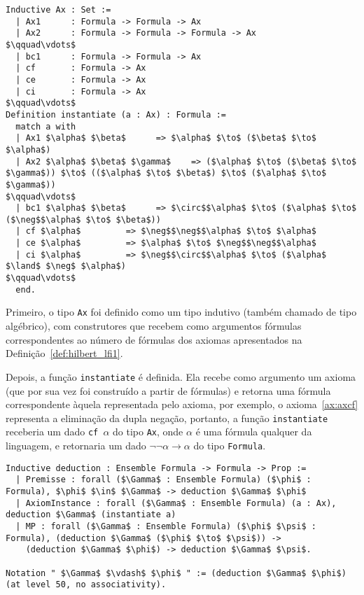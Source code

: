       \begin{lstlisting}[name=Syntax, frame=single, language=coq]
Inductive Ax : Set :=
  | Ax1      : Formula -> Formula -> Ax
  | Ax2      : Formula -> Formula -> Formula -> Ax
$\qquad\vdots$
  | bc1      : Formula -> Formula -> Ax
  | cf       : Formula -> Ax
  | ce       : Formula -> Ax
  | ci       : Formula -> Ax
$\qquad\vdots$
Definition instantiate (a : Ax) : Formula :=
  match a with 
  | Ax1 $\alpha$ $\beta$      => $\alpha$ $\to$ ($\beta$ $\to$ $\alpha$)
  | Ax2 $\alpha$ $\beta$ $\gamma$    => ($\alpha$ $\to$ ($\beta$ $\to$ $\gamma$)) $\to$ (($\alpha$ $\to$ $\beta$) $\to$ ($\alpha$ $\to$ $\gamma$))
$\qquad\vdots$
  | bc1 $\alpha$ $\beta$      => $\circ$$\alpha$ $\to$ ($\alpha$ $\to$ ($\neg$$\alpha$ $\to$ $\beta$))
  | cf $\alpha$         => $\neg$$\neg$$\alpha$ $\to$ $\alpha$
  | ce $\alpha$         => $\alpha$ $\to$ $\neg$$\neg$$\alpha$
  | ci $\alpha$         => $\neg$$\circ$$\alpha$ $\to$ ($\alpha$ $\land$ $\neg$ $\alpha$)
$\qquad\vdots$
  end.
      \end{lstlisting}

      Primeiro, o tipo \texttt{Ax} foi definido como um tipo indutivo (também chamado de tipo algébrico), com construtores que recebem como argumentos fórmulas correspondentes ao número de fórmulas dos axiomas apresentados na Definição~\ref{def:hilbert_lfi1}. 
      
      Depois, a função \texttt{instantiate} é definida. Ela recebe como argumento um axioma (que por sua vez foi construído a partir de fórmulas) e retorna uma fórmula correspondente àquela representada pelo axioma, por exemplo, o axioma~\ref{ax:axcf} representa a eliminação da dupla negação, portanto, a função \texttt{instantiate} receberia um dado \texttt{cf $\alpha$} do tipo \texttt{Ax}, onde $\alpha$ é uma fórmula qualquer da linguagem, e retornaria um dado $\neg\neg\alpha \to \alpha$ do tipo \texttt{Formula}.

      \begin{lstlisting}[name=Syntax, frame=single, language=coq]
Inductive deduction : Ensemble Formula -> Formula -> Prop :=
  | Premisse : forall ($\Gamma$ : Ensemble Formula) ($\phi$ : Formula), $\phi$ $\in$ $\Gamma$ -> deduction $\Gamma$ $\phi$
  | AxiomInstance : forall ($\Gamma$ : Ensemble Formula) (a : Ax), deduction $\Gamma$ (instantiate a)
  | MP : forall ($\Gamma$ : Ensemble Formula) ($\phi$ $\psi$ : Formula), (deduction $\Gamma$ ($\phi$ $\to$ $\psi$)) -> 
    (deduction $\Gamma$ $\phi$) -> deduction $\Gamma$ $\psi$.

Notation " $\Gamma$ $\vdash$ $\phi$ " := (deduction $\Gamma$ $\phi$) (at level 50, no associativity).
      \end{lstlisting}

